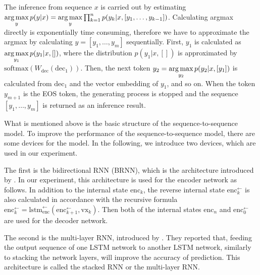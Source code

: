 \documentclass[senior,final,11pt]{iscs-thesis}
\newcommand{\argmax}{\mathop{\rm arg\,max}\limits}
\begin{document}
The inference from sequence $x$ is carried out by estimating
$ \argmax_{y} p(y|x) = \argmax_{y} \prod_{k=1}^n p(y_k|x,[y_1,\dots,y_{k-1}]) $.
Calculating argmax directly is exponentially time consuming, therefore we have to approximate the argmax by calculating $y = [y_1, \dots, y_m]$ sequentially.
First, $y_1$ is calculated as $ \argmax_{y_1} p(y_1|x,[]) $, where the distribution $ p(y_1|x,[]) $ is approximated by 
$ \mathrm{softmax}(W_{\mathrm{dec}}(\mathrm{dec}_{1}))$. 
Then, the next token $y_2 = \argmax_{y_2} p(y_2|x,[y_1]) $ is calculated from $ \mathrm{dec}_{1} $ and the vector embedding of $y_1$, and so on.
When the token $y_{m+1}$ is the EOS token, the generating process is stopped and the sequence $ [y_1, \dots ,y_m]$ is returned as an inference result.



What is mentioned above is the basic structure of the sequence-to-sequence model.
To improve the performance of the sequence-to-sequence model, there are some devices for the model.
In the following, we introduce two devices, which are used in our experiment.

The first is the bidirectional RNN (BRNN), which is the architecture introduced by \citet{BiRNN}.
In our experiment, this architecture is used for the encoder network as follows.
In addition to the internal state $ \mathrm{enc}_{k} $, the reverse internal state $ \mathrm{enc}_{k}^{\gets} $ is also calculated 
in accordance with the recursive formula $ \mathrm{enc}_{k}^{\gets} = \mathrm{lstm}_{\mathrm{enc}}^{\gets}(\mathrm{enc}_{k+1}^{\gets},\mathrm{vx}_{k}) $.
Then both of the internal states $ \mathrm{enc}_{n} $ and $ \mathrm{enc}_{0}^{\gets} $ are used for the decoder network.

The second is the multi-layer RNN, introduced by \citet{multi_layer}.
They reported that, feeding the output sequence of one LSTM network to another LSTM network, similarly to stacking the network layers, will improve the accuracy of prediction.
This architecture is called the stacked RNN or the multi-layer RNN.



\end{document}
